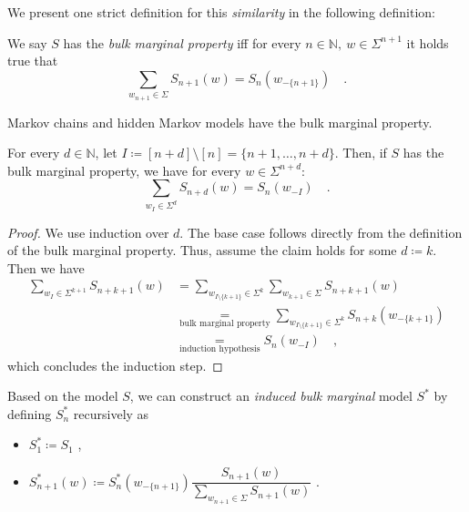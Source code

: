 \documentclass[../../main.tex]{subfiles}
\begin{document}
    We present one strict definition for this \emph{similarity} in the following definition:

    \begin{definition}
        We say $S$ has the \emph{bulk marginal property} iff for every $n \in \mathbb{N}, \ w \in \Sigma^{n + 1}$ it holds true that
        \[
            \sum_{w_{n + 1} \in \Sigma} S_{n + 1}(w) = S_n(w_{-\{n + 1\}}) \quad .
        \]
    \end{definition}

    \begin{remark}
        Markov chains and hidden Markov models have the bulk marginal property.
    \end{remark}

\pagebreak
    \begin{lemma}
        \label{lemma:random_variables_do_not_change_with_future_models}
        For every $d \in \mathbb{N}$, let $I \coloneqq [n + d] \setminus [n] = \{ n+1, \dots, n + d \}$. Then, if $S$ has the bulk marginal property, we have for every $w \in \Sigma^{n + d}$:
        \[
            \sum_{w_I \in \Sigma^d} S_{n + d}(w) = S_n(w_{-I}) \quad .
        \]
    \end{lemma}
    \begin{proof}
        We use induction over $d$. The base case follows directly from the definition of the bulk marginal property. Thus, assume the claim holds for some $d \coloneqq k$. Then we have
        \begin{align*}
            \sum_{w_I \in \Sigma^{k + 1}} S_{n + k + 1}(w) &= \sum_{w_{I \setminus \{ k + 1 \}} \in \Sigma^{k}} \sum_{w_{k + 1} \in \Sigma} S_{n + k + 1}(w) \\
            &\underset{\text{bulk marginal property}}{=} \sum_{w_{I \setminus \{ k + 1 \}} \in \Sigma^{k}} S_{n + k}(w_{-\{ k + 1 \}}) \\
            &\underset{\text{induction hypothesis}}{=} S_n(w_{-I}) \quad ,
        \end{align*}
        which concludes the induction step.
    \end{proof}

    \begin{definition}
        \label{def:induced_bulk_marginal_model}
        Based on the model $S$, we can construct an \emph{induced bulk marginal} model $S^*$ by defining $S_n^*$ recursively as 
        \begin{itemize}
            \item $S_1^* \coloneqq S_1$ ,
            \item $S_{n + 1}^*(w) \coloneqq S_n^*(w_{-\{n+1\}}) \dfrac{S_{n+1}(w)}{\sum_{w_{n+1} \in \Sigma} S_{n+1}(w)}$ .
        \end{itemize}
    \end{definition}
\end{document}
